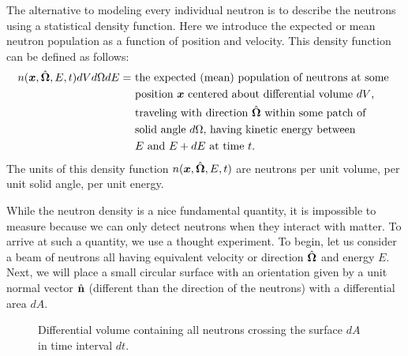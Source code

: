 The alternative to modeling every individual neutron is to describe the neutrons using a statistical density function. Here we introduce the expected or mean neutron population as a function of position and velocity. This density function can be defined as follows:
\begin{align}
  n(\bm{x},\hat{\mathbf{\Omega}},E,t) dV d\Omega dE = 
  &\text{ the expected (mean) population of neutrons at some } \nonumber \\*
  &\text{ position $\bm{x}$ centered about differential volume $dV$, } \nonumber \\*
  &\text{ traveling with direction $\hat{\mathbf{\Omega}}$ within  some patch of } \nonumber \\*
  &\text{ solid angle $d\Omega$, having kinetic energy between } \nonumber \\*
  &\text{ $E$ and $E + dE$ at time $t$.} \nonumber
\end{align}
The units of this density function $n(\bm{x},\hat{\mathbf{\Omega}},E,t)$ are neutrons per unit volume, per unit solid angle, per unit energy. 

While the neutron density is a nice fundamental quantity, it is impossible to measure because we can only detect neutrons when they interact with matter. To arrive at such a quantity, we use a thought experiment. To begin, let us consider a beam of neutrons all having equivalent velocity or direction $\hat{\mathbf{\Omega}}$ and energy $E$. Next, we will place a small circular surface with an orientation given by a unit normal vector $\hat{\mathbf{n}}$ (different than the direction of the neutrons) with a differential area $dA$. 

\begin{figure}[tb!]
\begin{center}
\caption{Differential volume containing all neutrons crossing the surface $dA$ in time interval $dt$.}
\label{Fig:neutronics_dV_neutronsCrossing}
\end{center}
\end{figure}

